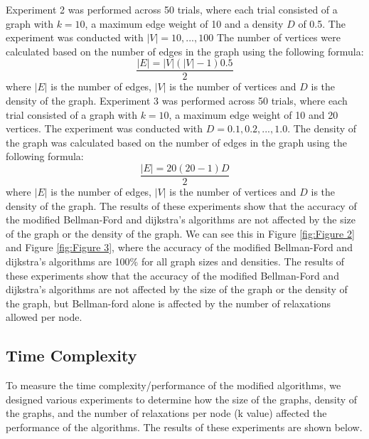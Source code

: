 \documentclass{article}
\begin{document}
\begin{onehalfspace}
Experiment 2 was performed across 50 trials, where each trial consisted of a graph with $k=10$, a maximum edge weight of 10 and a density $D$ of 0.5. The experiment was conducted with $|V| = 10, ... , 100$ The number of vertices were calculated based on the number of edges in the graph using the following formula: $$\frac{|E| = |V|(|V| - 1) 0.5}{2}$$
where $|E|$ is the number of edges, $|V|$ is the number of vertices and $D$ is the density of the graph. 
\smallskip
\newline
\indent
Experiment 3 was performed across 50 trials, where each trial consisted of a graph with $k = 10$, a maximum edge weight of 10 and 20 vertices. The experiment was conducted with $D = 0.1, 0.2, ... , 1.0$. The density of the graph was calculated based on the number of edges in the graph using the following formula: $$\frac{|E| = 20(20 - 1) D}{2}$$
where $|E|$ is the number of edges, $|V|$ is the number of vertices and $D$ is the density of the graph.
\smallskip
\newline
\indent
The results of these experiments show that the accuracy of the modified Bellman-Ford and dijkstra's algorithms are not affected by the size of the graph
or the density of the graph. We can see this in Figure \ref{fig:Figure 2} and Figure \ref{fig:Figure 3}, where the accuracy of the modified Bellman-Ford and dijkstra's algorithms are 100\% for all graph sizes and densities. 
\smallskip
\newline
\indent
The results of these experiments show that the accuracy of the modified Bellman-Ford and dijkstra's algorithms are not affected by the size of the graph or the density of the graph, but Bellman-ford alone is 
affected by the number of relaxations allowed per node.

\subsection*{Time Complexity}
To measure the time complexity/performance of the modified algorithms, we designed various experiments
to determine how the size of the graphs, density of the graphs, and the number of relaxations per node (k value) affected the performance of the algorithms.
The results of these experiments are shown below.


\end{onehalfspace}
\end{document}
